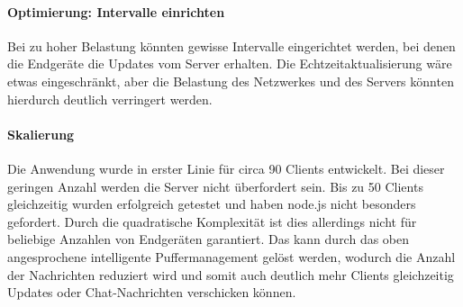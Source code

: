 \paragraph{Optimierung: Intervalle einrichten}
Bei zu hoher Belastung könnten gewisse Intervalle eingerichtet werden, bei denen die Endgeräte die Updates vom Server erhalten. Die Echtzeitaktualisierung wäre etwas eingeschränkt, aber die Belastung des Netzwerkes und des Servers könnten hierdurch deutlich verringert werden.

\paragraph{Skalierung}
Die Anwendung wurde in erster Linie für circa 90 Clients entwickelt. Bei dieser geringen Anzahl werden die Server nicht überfordert sein. Bis zu 50 Clients gleichzeitig wurden erfolgreich getestet und haben node.js nicht besonders gefordert. Durch die quadratische Komplexität ist dies allerdings nicht für beliebige Anzahlen von Endgeräten garantiert. Das kann durch das oben angesprochene intelligente Puffermanagement gelöst werden, wodurch die Anzahl der Nachrichten reduziert wird und somit auch deutlich mehr Clients gleichzeitig Updates oder Chat-Nachrichten verschicken können.








